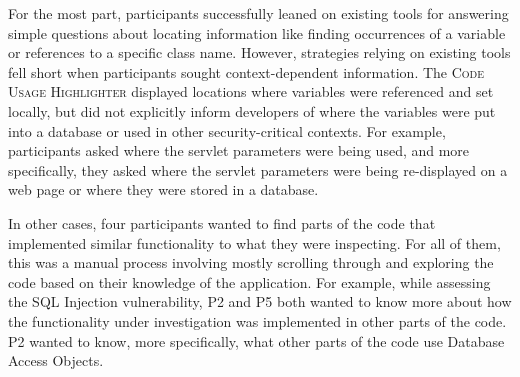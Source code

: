 \documentclass[conference]{IEEEtran}
\begin{document}
For the most part, participants successfully leaned on existing tools for answering simple questions about locating information like finding occurrences of a variable or references to a specific class name. 
However, strategies relying on existing tools fell short when participants sought context-dependent information. 
The \textsc{Code Usage Highlighter} displayed locations where variables were referenced and set locally, but did not explicitly inform developers of where the variables were put into a database or used in other security-critical contexts.
For example, participants asked where the servlet parameters were being used, and more specifically, they asked where the servlet parameters were being re-displayed on a web page or where they were stored in a database.

In other cases, four participants wanted to find parts of the code that implemented similar functionality to what they were inspecting.
For all of them, this was a manual process involving mostly scrolling through and exploring the code based on their knowledge of the application.
For example, while assessing the SQL Injection vulnerability, P2 and P5 both wanted to know more about how the functionality under investigation was implemented in other parts of the code. 
P2 wanted to know, more specifically, what other parts of the code use Database Access Objects.
\\



\end{document}
